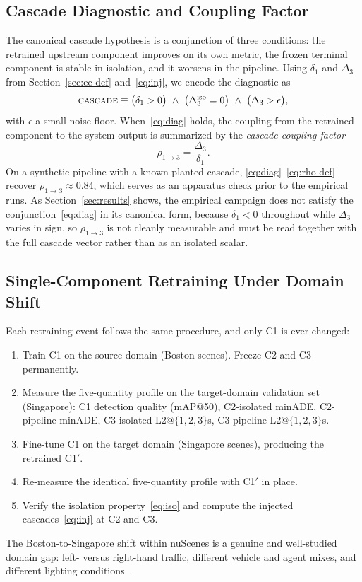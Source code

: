 \documentclass[conference]{IEEEtran}
\begin{document}
\subsection{Cascade Diagnostic and Coupling Factor}
\label{sec:diag}
The canonical cascade hypothesis is a conjunction of three conditions: the
retrained upstream component improves on its own metric, the frozen terminal
component is stable in isolation, and it worsens in the pipeline. Using
$\delta_1$ and $\Delta_3$ from Section~\ref{sec:ee-def} and~\eqref{eq:inj}, we
encode the diagnostic as
\begin{equation}
\textsc{cascade} \equiv
\bigl(\delta_1 > 0\bigr)
\ \wedge\
\bigl(\Delta_3^{\text{iso}} = 0\bigr)
\ \wedge\
\bigl(\Delta_3 > \epsilon\bigr),
\label{eq:diag}
\end{equation}
with $\epsilon$ a small noise floor. When~\eqref{eq:diag} holds, the
coupling from the retrained component to the system output is summarized by
the \emph{cascade coupling factor}
\begin{equation}
\rho_{1\to 3} = \frac{\Delta_3}{\delta_1}.
\label{eq:rho-def}
\end{equation}
On a synthetic pipeline with a known planted cascade,
\eqref{eq:diag}--\eqref{eq:rho-def} recover $\rho_{1\to 3} \approx 0.84$, which
serves as an apparatus check prior to the empirical runs. As
Section~\ref{sec:results} shows, the empirical campaign does not satisfy the
conjunction~\eqref{eq:diag} in its canonical form, because $\delta_1 < 0$
throughout while $\Delta_3$ varies in sign, so $\rho_{1\to 3}$ is not cleanly
measurable and must be read together with the full cascade vector rather than as
an isolated scalar.

\subsection{Single-Component Retraining Under Domain Shift}
\label{sec:experiment}
Each retraining event follows the same procedure, and only C1 is ever changed:
\begin{enumerate}
\item Train C1 on the source domain (Boston scenes). Freeze C2 and C3
permanently.
\item Measure the five-quantity profile on the target-domain validation set
(Singapore): C1 detection quality (mAP@50), C2-isolated minADE, C2-pipeline
minADE, C3-isolated L2@$\{1,2,3\}$s, C3-pipeline L2@$\{1,2,3\}$s.
\item Fine-tune C1 on the target domain (Singapore scenes), producing the
retrained C1$'$.
\item Re-measure the identical five-quantity profile with C1$'$ in place.
\item Verify the isolation property~\eqref{eq:iso} and compute the injected
cascades~\eqref{eq:inj} at C2 and C3.
\end{enumerate}
The Boston-to-Singapore shift within nuScenes is a genuine and well-studied
domain gap: left- versus right-hand traffic, different vehicle and agent
mixes, and different lighting conditions~\cite{caesar2020nuscenes}.
\end{document}
